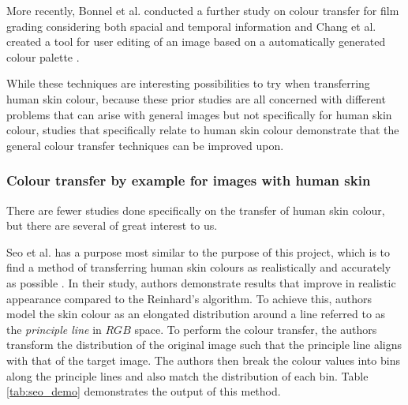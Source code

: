 More recently, Bonnel et al. conducted a further study on colour transfer for film grading considering both spacial and temporal information \cite{bonneel_2013_video} and Chang et al. created a tool for user editing of an image based on a automatically generated colour palette \cite{chang_2015_palette}.

While these techniques are interesting possibilities to try when transferring human skin colour, because these prior studies are all concerned with different problems that can arise with general images but not specifically for human skin colour, studies that specifically relate to human skin colour demonstrate that the general colour transfer techniques can be improved upon.

\subsubsection{Colour transfer by example for images with human skin}
There are fewer studies done specifically on the transfer of human skin colour, but there are several of great interest to us.

Seo et al. has a purpose most similar to the purpose of this project, which is to find a method of transferring human skin colours as realistically and accurately as possible \cite{seo_2005_transfer}. In their study, authors demonstrate results that improve in realistic appearance compared to the Reinhard's algorithm. To achieve this, authors model the skin colour as an elongated distribution around a line referred to as the \textit{principle line} in $RGB$ space. To perform the colour transfer, the authors transform the distribution of the original image such that the principle line aligns with that of the target image. The authors then break the colour values into bins along the principle lines and also match the distribution of each bin. Table \ref{tab:seo_demo} demonstrates the output of this method.

